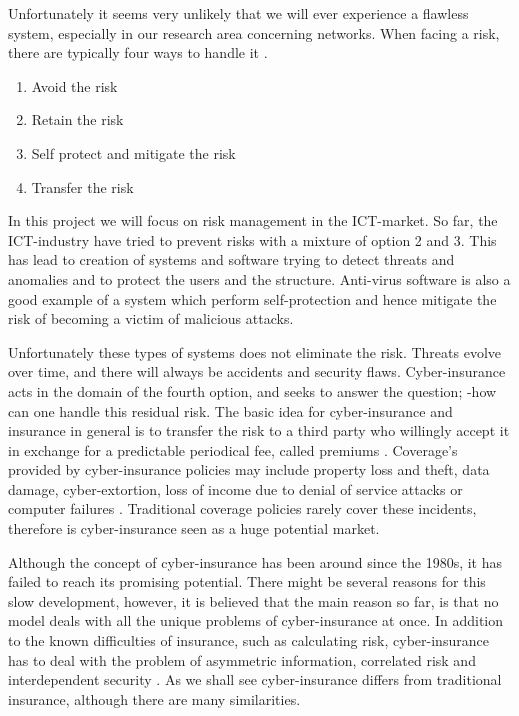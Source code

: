 Unfortunately it seems very unlikely that we will ever experience a flawless system, especially in our research area concerning networks. When facing a risk, there are typically four ways to handle it \cite{bolot2008new}.
\begin{enumerate}
\item Avoid the risk
\item Retain the risk
\item Self protect and mitigate the risk
\item Transfer the risk
\end{enumerate}
In this project we will focus on risk management in the ICT-market. So far, the ICT-industry have tried to prevent risks with a mixture of option 2 and 3. This has lead to creation of systems and software trying to detect threats and anomalies and to protect the users and the structure. Anti-virus software is also a good example of a system which perform self-protection and hence mitigate the risk of becoming a victim of malicious attacks.

Unfortunately these types of systems does not eliminate the risk. Threats evolve over time, and there will always be accidents and security flaws. Cyber-insurance acts in the domain of the fourth option, and seeks to answer the question; -how can one handle this residual risk. The basic idea for cyber-insurance and insurance in general is to transfer the risk to a third party who willingly accept it in exchange for a predictable periodical fee, called premiums \cite{bolot2008cyber}. Coverage’s provided by cyber-insurance policies may include property loss and theft, data damage, cyber-extortion, loss of income due to denial of service attacks or computer failures 
 \cite{washingtonpaper}.
Traditional coverage policies rarely cover these incidents, therefore is cyber-insurance seen as a huge potential market.

Although the concept of cyber-insurance has been around since the 1980s, it has failed to reach its promising potential. There might be several reasons for this slow development, however, it is believed that the main reason so far, is that no model deals with all the unique problems of cyber-insurance at once. In addition to the known difficulties of insurance, such as calculating risk, cyber-insurance has to deal with the problem of asymmetric information, correlated risk and interdependent security \cite{networkgames}. As we shall see cyber-insurance differs from traditional insurance, although there are many similarities. 

